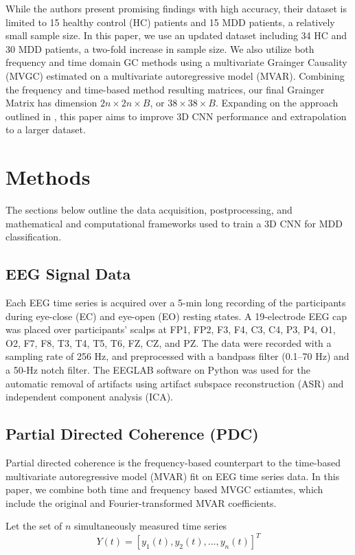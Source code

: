 \documentclass[twocolumn]{NobArticle}
\begin{document}
    While the authors present promising findings with high accuracy, their dataset is limited to 15 healthy control (HC) patients and 15 MDD patients, a relatively small sample size. In this paper, we use an updated dataset including 34 HC and 30 MDD patients, a two-fold increase in sample size. We also utilize both frequency and time domain GC methods using a multivariate Grainger Causality (MVGC) estimated on a multivariate autoregressive model (MVAR). Combining the frequency and time-based method resulting matrices, our final Grainger Matrix has dimension $2n\times2n\times B$, or $38\times38\times B$. Expanding on the approach outlined in \cite{Miljevic2023_EEGconnectivity}, this paper aims to improve 3D CNN  performance and extrapolation to a larger dataset. 


\section{Methods}
The sections below outline the data acquisition, postprocessing, and mathematical and computational frameworks used to train a 3D CNN for MDD classification. 
\subsection{EEG Signal Data}
Each EEG time series is acquired over a 5-min long recording of the participants during eye-close (EC) and eye-open (EO) resting states. A 19-electrode EEG cap was placed over participants' scalps at FP1, FP2, F3, F4, C3, C4, P3, P4, O1, O2, F7, F8, T3, T4, T5, T6, FZ, CZ, and PZ. The data were recorded with a sampling rate of 256 Hz, and preprocessed with a bandpass filter (0.1–70 Hz) and a 50-Hz notch filter. The EEGLAB software on Python was used for the automatic removal of artifacts using artifact subspace reconstruction (ASR) and independent component analysis (ICA). 

\subsection{Partial Directed Coherence (PDC)}
Partial directed coherence is the frequency-based counterpart to the time-based multivariate autoregressive model (MVAR) fit on EEG time series data. In this paper, we combine both time and frequency based MVGC estiamtes, which include the original and Fourier-transformed MVAR coefficients. 

Let the set of $n$ simultaneously measured time series 
\begin{equation}
    Y(t) = [y_1(t), y_2(t),..., y_n(t)]^T
\end{equation}
\end{document}
